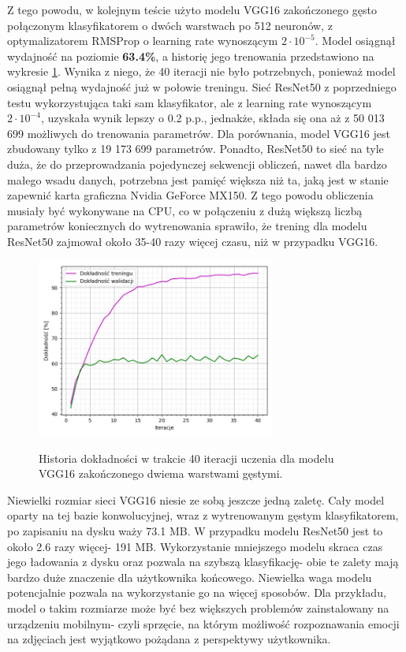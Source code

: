 Z tego powodu, w kolejnym teście użyto modelu VGG16 zakończonego gęsto połączonym klasyfikatorem o dwóch warstwach po 512 neuronów, z optymalizatorem RMSProp o learning rate wynoszącym $2\cdot10^{-5}$. Model osiągnął wydajność na poziomie \textbf{63.4\%}, a historię jego trenowania przedstawiono na wykresie \ref{pic:5.7}. Wynika z niego, że 40 iteracji nie było potrzebnych, ponieważ model osiągnął pełną wydajność już w połowie treningu. Sieć ResNet50 z poprzedniego testu wykorzystująca taki sam klasyfikator, ale z learning rate wynoszącym $2\cdot10^{-4}$, uzyskała wynik lepszy o 0.2 p.p., jednakże, składa się ona aż z 50 013 699 możliwych do trenowania parametrów. Dla porównania, model VGG16 jest zbudowany tylko z 19 173 699 parametrów. Ponadto, ResNet50 to sieć na tyle duża, że do przeprowadzania pojedynczej sekwencji obliczeń, nawet dla bardzo małego wsadu danych, potrzebna jest pamięć większa niż ta, jaką jest w stanie zapewnić karta graficzna Nvidia GeForce MX150. Z tego powodu obliczenia musiały być wykonywane na CPU, co w połączeniu z dużą większą liczbą parametrów koniecznych do wytrenowania sprawiło, że trening dla modelu ResNet50 zajmował około 35-40 razy więcej czasu, niż w przypadku VGG16.

\begin{figure}[H]
    \caption{Historia dokładności w trakcie 40 iteracji uczenia dla modelu VGG16 zakończonego dwiema warstwami gęstymi.}
    \centering
    \includegraphics[width=0.7\textwidth]{wykres7.png}
    \label{pic:5.7}
\end{figure}

Niewielki rozmiar sieci VGG16 niesie ze sobą jeszcze jedną zaletę. Cały model oparty na tej bazie konwolucyjnej, wraz z wytrenowanym gęstym klasyfikatorem, po zapisaniu na dysku waży 73.1 MB. W przypadku modelu ResNet50 jest to około 2.6 razy więcej- 191 MB. Wykorzystanie mniejszego modelu skraca czas jego ładowania z dysku oraz pozwala na szybszą klasyfikację- obie te zalety mają bardzo duże znaczenie dla użytkownika końcowego. Niewielka waga modelu potencjalnie pozwala na wykorzystanie go na więcej sposobów. Dla przykładu, model o takim rozmiarze może być bez większych problemów zainstalowany na urządzeniu mobilnym- czyli sprzęcie, na którym możliwość rozpoznawania emocji na zdjęciach jest wyjątkowo pożądana z perspektywy użytkownika. %

